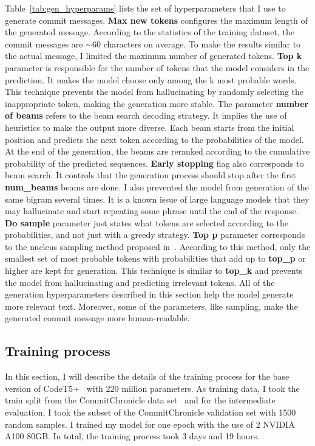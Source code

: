 Table~\ref{tab:gen_hyperparams} lists the set of hyperparameters that I use to generate commit messages. \textbf{Max new tokens} configures the maximum length of the generated message. According to the statistics of the training dataset, the commit messages are $\sim60$ characters on average. To make the results similar to the actual message, I limited the maximum number of generated tokens. \textbf{Top k} parameter is responsible for the number of tokens that the model considers in the prediction. It makes the model choose only among the k most probable words. This technique prevents the model from hallucinating by randomly selecting the inappropriate token, making the generation more stable. The parameter \textbf{ number of beams} refers to the beam search decoding strategy. It implies the use of heuristics to make the output more diverse. Each beam starts from the initial position and predicts the next token according to the probabilities of the model. At the end of the generation, the beams are reranked according to the cumulative probability of the predicted sequences. \textbf{Early stopping} flag also corresponds to beam search. It controls that the generation process should stop after the first \textbf{num\_beams} beams are done. 
I also prevented the model from generation of the same bigram several times. It is a known issue of large language models that they may hallucinate and start repeating some phrase until the end of the response. 
\textbf{Do sample} parameter just states what tokens are selected according to the probabilities, and not just with a greedy strategy.
\textbf{Top p} parameter corresponds to the nucleus sampling method proposed in~\cite{holtzman2019curious}. According to this method, only the smallest set of most probable tokens with probabilities that add up to \textbf{top\_p} or higher are kept for generation. This technique is similar to \textbf{top\_k} and prevents the model from hallucinating and predicting irrelevant tokens.
All of the generation hyperparameters described in this section help the model generate more relevant text. Moreover, some of the parameters, like sampling, make the generated commit message more human-readable. 

\subsection{Training process}
In this section, I will describe the details of the training process for the base version of CodeT5+~\cite{wang2023codet5+} with 220 million parameters. As training data, I took the train split from the CommitChronicle data set~\cite{eliseeva2023commit} and for the intermediate evaluation, I took the subset of the CommitChronicle validation set with 1500 random samples. I trained my model for one epoch with the use of 2 NVIDIA A100 80GB. In total, the training process took 3 days and 19 hours. 

